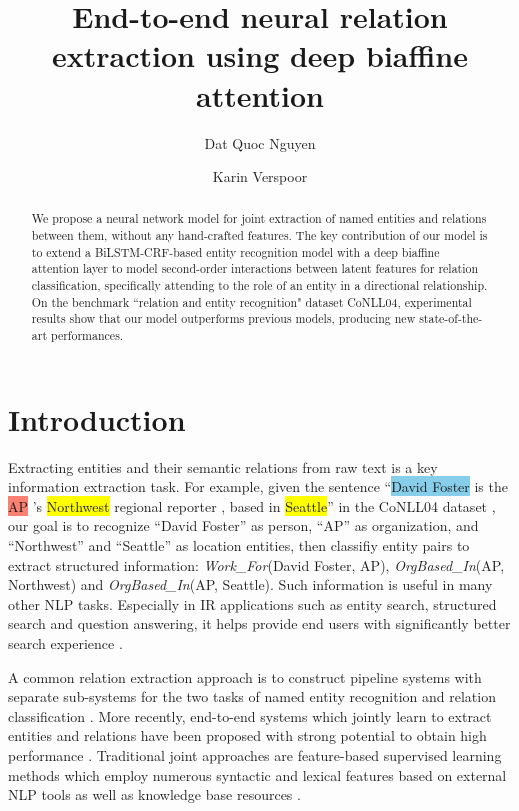 \documentclass[runningheads]{llncs}
\title{End-to-end neural relation extraction using deep biaffine attention}
\author{Dat Quoc Nguyen \and Karin Verspoor}
\institute{The University of Melbourne, Australia\\
\email{\{dqnguyen, karin.verspoor\}@unimelb.edu.au}
}
\begin{document}
\maketitle

\begin{abstract}
  We propose a neural network model for joint extraction of named entities and relations between them, without any hand-crafted features. The key contribution of our model is to extend a  BiLSTM-CRF-based entity recognition model with a deep biaffine attention layer to model second-order interactions between latent features for relation classification, specifically attending to the role of an entity in a directional relationship. 
  On the benchmark ``relation and entity recognition"  dataset CoNLL04, experimental results show that our model outperforms previous models, producing new state-of-the-art performances.   
\end{abstract}


\section{Introduction}

Extracting entities and their semantic relations from raw text is a key information extraction task.  For example, given the sentence ``\colorbox{SkyBlue}{David Foster} is the \colorbox{Salmon}{AP} 's \colorbox{Yellow}{Northwest} regional reporter , based in \colorbox{Yellow}{Seattle}'' in the CoNLL04 dataset \cite{roth-yih:2004:CONLL}, our goal is to recognize ``David Foster'' as person, ``AP'' as  organization, and ``Northwest'' and ``Seattle'' as location entities, then classifiy entity pairs to extract structured information: \textsl{Work\_For}(David Foster, AP), \textsl{OrgBased\_In}(AP, Northwest) and \textsl{OrgBased\_In}(AP, Seattle). Such information is  useful  in many other NLP tasks. Especially in  IR  applications such as  entity search, structured search and question answering, it helps provide end users with significantly better search experience   \cite{Jiang2012,gks563,Blanco:2013}.




A common relation extraction approach  is to construct pipeline systems  with separate sub-systems for the two tasks of  named entity recognition and relation classification \cite{bach2007}. More recently, end-to-end systems which jointly learn to extract entities and relations have been proposed with strong potential to obtain  high performance  \cite{RothYi07}. 
Traditional joint approaches  are feature-based supervised learning methods which employ numerous  syntactic and lexical  features based on external NLP tools as well as knowledge base resources  \cite{Kate:2010,miwa-sasaki:2014:EMNLP2014,li-ji:2014:P14-1}. 
\end{document}
